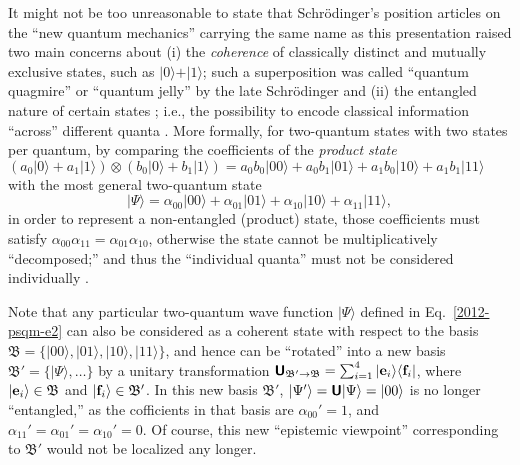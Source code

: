 \documentclass[%
 preprint,
 showpacs,
 showkeys,
 preprintnumbers,
 amsmath,amssymb,
 aps,
  pra,
  longbibliography,
 ]{revtex4-1}
\begin{document}
It might not be too unreasonable to state that Schr\"odinger's position articles on the ``new quantum mechanics''
carrying the same name as this presentation
\cite{schrodinger}
raised two main concerns about
(i) the {\em coherence} of classically distinct and mutually exclusive states, such as  $\vert 0 \rangle + \vert 1 \rangle$;
such a superposition was called ``quantum quagmire'' or ``quantum jelly'' by the late Schr\"odinger
and
(ii) the entangled nature of certain states \cite{schroedinger-interpretation}; i.e., the possibility
to encode classical information ``across'' different quanta \cite{zeil-99}.
More formally, for two-quantum states with two states per quantum, by comparing the coefficients of
the {\em product state}
$
\left(
a_0 \vert 0 \rangle + a_1 \vert 1 \rangle
\right)
\otimes
\left(
b_0 \vert 0 \rangle + b_1 \vert 1 \rangle
\right)
=
a_0b_0 \vert 00 \rangle + a_0b_1 \vert 01 \rangle
+
a_1b_0 \vert 10 \rangle + a_1b_1 \vert 11 \rangle
$
with the most general
two-quantum state
\begin{equation}
\vert \Psi\rangle =
\alpha_{00} \vert 00 \rangle + \alpha_{01}  \vert 01 \rangle
+
\alpha_{10}  \vert 10 \rangle + \alpha_{11}  \vert 11 \rangle
,
\label{2012-psqm-e2}
\end{equation}
in order to represent  a non-entangled (product) state,
those coefficients must satisfy
$
\alpha_{00}\alpha_{11} = \alpha_{01} \alpha_{10}
$,
otherwise the state  cannot be multiplicatively ``decomposed;''
and thus the ``individual quanta'' must not be considered individually
\cite[pp.~17-18]{mermin-07}.

Note that any particular two-quantum wave function $\vert \Psi\rangle$ defined in Eq.~\ref{2012-psqm-e2}
can also be considered as a coherent state with respect to the basis
${\mathfrak B}=\{
\vert 00 \rangle, \vert 01 \rangle , \vert 10 \rangle ,  \vert 11 \rangle
\}$,
and hence can be ``rotated'' into a new basis  ${\mathfrak B}'=\{\vert \Psi\rangle ,\ldots
\}$  by a unitary transformation \cite{Schwinger.60}
$
\textsf{\textbf{U}}_{{\mathfrak B}' \rightarrow {\mathfrak B}}
=
\sum_{i=1}^4
\vert {\bf e}_i\rangle
\langle {\bf f}_i \vert
$,
where
$\vert {\bf e}_i\rangle \in {\mathfrak B}$ and
$\vert {\bf f}_i\rangle \in {\mathfrak B}'$.
In this new basis ${\mathfrak B}'$, $\vert \Psi '\rangle = \textsf{\textbf{U}}\vert \Psi\rangle = \vert 00 \rangle$ is no longer ``entangled,''
as the cofficients in that basis are $\alpha_{00}'=1$, and $\alpha_{11}' = \alpha_{01}' = \alpha_{10}' = 0$.
Of course, this new ``epistemic viewpoint'' corresponding to  ${\mathfrak B}'$ \cite{DallaChiara-epistemic} would not be localized any longer.
\end{document}
